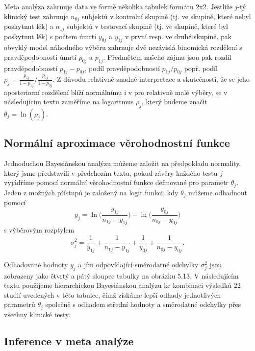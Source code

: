 Meta analýza zahrnuje data ve formě několika tabulek formátu 2x2. Jestliže $j$-tý klinický test zahrnuje $n_{0j}$ subjektů v kontrolní skupině (tj. ve skupině, které nebyl poskytnut lék) a $n_{1j}$ subjektů v testovací skupině (tj. ve skupině, které byl poskytnut lék) s počtem úmrtí $y_{0j}$ a $y_{1j}$ v první resp. ve druhé skupině, pak obvyklý model náhodného výběru zahrnuje dvě nezávislá binomická rozdělení s pravděpodobností úmrtí $p_{0j}$ a $p_{1j}$. Předmětem našeho zájmu jsou pak rozdíl pravděpodobností $p_{1j} - p_{0j}$, podíl pravděpodobností $p_{1j} / p_{0j}$ popř. podíl $\rho_j = \frac{p_{1j}}{1 - p_{1j}} / \frac{p_{0j}}{1 - p_{0j}}$. Z důvodu relativně snadné interpretace a skutečnosti, že se jeho aposteriorní rozdělení blíží normálnímu i v pro relativně malé výběry, se v následujícím textu zaměříme na logaritmus $\rho_j$, který budeme značit $\theta_j = \ln(\rho_j)$.

\subsection{Normální aproximace věrohodnostní funkce}

Jednoduchou Bayesiánskou analýzu můžeme založit na předpokladu normality, který jsme představili v předchozím textu, pokud závěry každého testu $j$ vyjádříme pomocí normální věrohodnostní funkce definované pro parametr $\theta_j$. Jeden z možných přístupů je založený na logit funkci, kdy $\theta_j$ můžeme odhadnout pomocí
\begin{equation}
y_j = \ln \Big(\frac{y_{1j}}{n_{1j} - y_{1j}}\Big) - \ln \Big(\frac{y_{0j}}{n_{0j} - y_{0j}}\Big)
\end{equation}
s výběrovým rozptylem
\begin{equation}
\sigma_j^2 = \frac{1}{y_{1j}} + \frac{1}{n_{1j} - y_{1j}} + \frac{1}{y_{0j}} + \frac{1}{n_{0j} - y_{0j}}.
\end{equation}

Odhadované hodnoty $y_j$ a jím odpovídající směrodatné odchylky $\sigma_j^2$ jsou zobrazeny jako čtvrtý a pátý sloupec tabulky na obrázku 5.13. V následujícím textu použijeme hierarchickou Bayesiánskou analýzu ke kombinaci výsledků 22 studií uvedených v této tabulce, čímž získáme lepší odhady jednotlivých parametrů $\theta_j$ společně s odhadem střední hodnoty a směrodatné odchylky přes všechny klinické testy.

\subsection{Inference v meta analýze}

